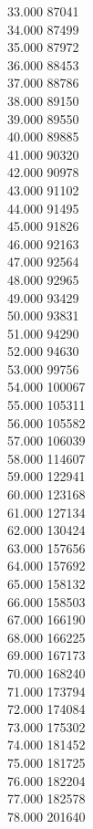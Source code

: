 { 33.000	87041 \\
 34.000	87499 \\
 35.000	87972 \\
 36.000	88453 \\
 37.000	88786 \\
 38.000	89150 \\
 39.000	89550 \\
 40.000	89885 \\
 41.000	90320 \\
 42.000	90978 \\
 43.000	91102 \\
 44.000	91495 \\
 45.000	91826 \\
 46.000	92163 \\
 47.000	92564 \\
 48.000	92965 \\
 49.000	93429 \\
 50.000	93831 \\
 51.000	94290 \\
 52.000	94630 \\
 53.000	99756 \\
 54.000	100067 \\
 55.000	105311 \\
 56.000	105582 \\
 57.000	106039 \\
 58.000	114607 \\
 59.000	122941 \\
 60.000	123168 \\
 61.000	127134 \\
 62.000	130424 \\
 63.000	157656 \\
 64.000	157692 \\
 65.000	158132 \\
 66.000	158503 \\
 67.000	166190 \\
 68.000	166225 \\
 69.000	167173 \\
 70.000	168240 \\
 71.000	173794 \\
 72.000	174084 \\
 73.000	175302 \\
 74.000	181452 \\
 75.000	181725 \\
 76.000	182204 \\
 77.000	182578 \\
 78.000	201640 \\
}
